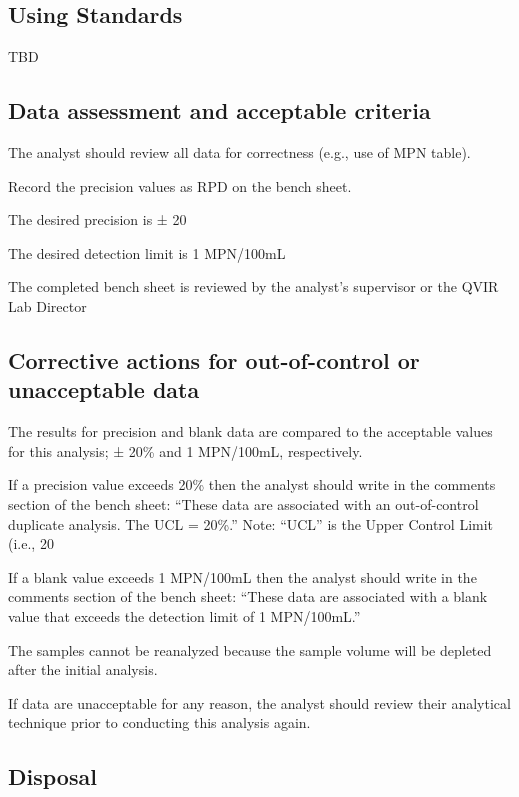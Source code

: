 \documentclass[12pt]{../SOP4_alpha}\usepackage[]{graphicx}\usepackage[]{xcolor}
\begin{document}
\subsection{Using Standards}

\NP TBD

\subsection{Data assessment and acceptable criteria}

\NP The analyst should review all data for correctness (e.g., use of MPN table).


\NP Record the precision values as RPD on the bench sheet.

\NP The desired precision is ± 20%

\NP The desired detection limit is 1 MPN/100mL

\NP The completed bench sheet is reviewed by the analyst's supervisor or the
QVIR Lab Director 


\subsection{Corrective actions for out-of-control or unacceptable data}

\NP The results for precision and blank data are compared to the
acceptable values for this analysis; ± 20\% and 1 MPN/100mL,
respectively.

\NP If a precision value exceeds 20\% then the analyst should write in the
comments section of the bench sheet: “These data are associated
with an out-of-control duplicate analysis. The UCL = 20\%.” Note:
“UCL” is the Upper Control Limit (i.e., 20%

\NP If a blank value exceeds 1 MPN/100mL then the analyst should write
in the comments section of the bench sheet: “These data are
associated with a blank value that exceeds the detection limit of 1
MPN/100mL.”

\NP The samples cannot be reanalyzed because the sample volume will be
depleted after the initial analysis.

\NP  If data are unacceptable for any reason, the analyst should review
their analytical technique prior to conducting this analysis again. 

\subsection{Disposal}
\end{document}
